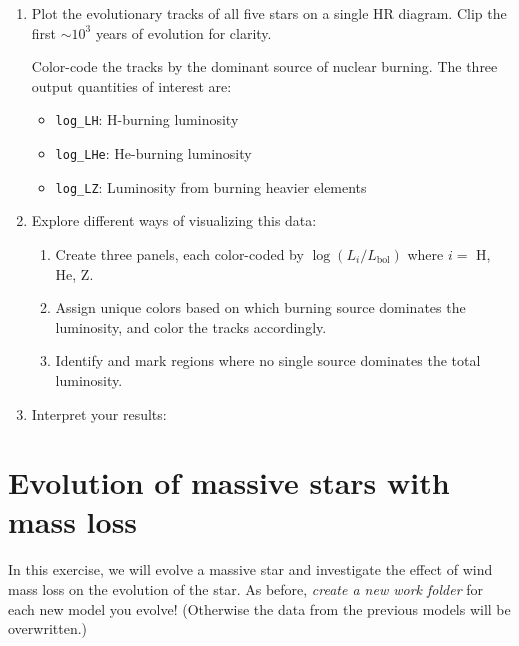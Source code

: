 \documentclass[11pt,a4paper]{article}
\begin{document}
\begin{enumerate}
    \item Plot the evolutionary tracks of all five stars on a single HR diagram. 
    Clip the first $\sim 10^3$ years of evolution for clarity.

    Color-code the tracks by the dominant source of nuclear burning. The three output quantities of interest are:
    \begin{itemize}
        \item \texttt{log\_LH}: H-burning luminosity
        \item \texttt{log\_LHe}: He-burning luminosity
        \item \texttt{log\_LZ}: Luminosity from burning heavier elements
    \end{itemize}
    \item Explore different ways of visualizing this data:
    \begin{enumerate}[label=(\alph*)]
        \item Create three panels, each color-coded by $\log (L_i/L_{\text{bol}})$ where $i = $ H, He, Z.
        \item Assign unique colors based on which burning source dominates the luminosity, and color the tracks accordingly.
        \item Identify and mark regions where no single source dominates the total luminosity.
    \end{enumerate}

    \item Interpret your results: 

\end{enumerate}

\section{Evolution of massive stars with mass loss}

In this exercise, we will evolve a massive star and investigate the effect of wind mass loss on the evolution of the star. As before, \emph{create a new work folder} for each new model you evolve! (Otherwise the data from the previous models will be overwritten.)
\end{document}
